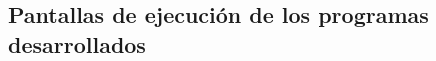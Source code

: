 \documentclass[12pt]{article}
\begin{document}
        
        \newpage
    	\subsection{Pantallas de ejecución de los programas desarrollados}

                        
\end{document}
